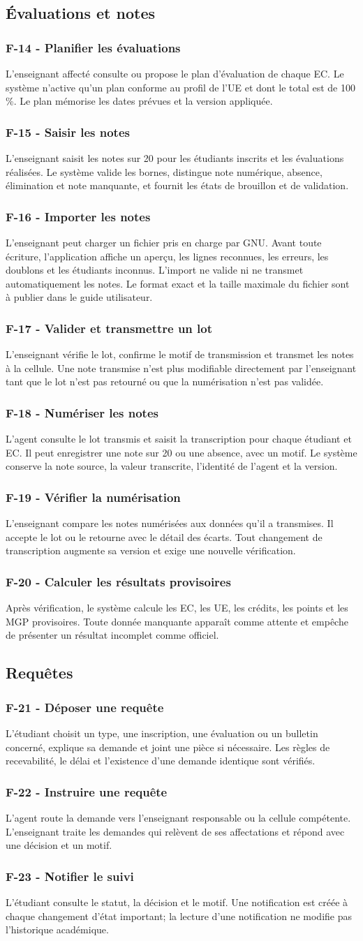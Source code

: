 \documentclass[11pt,a4paper]{article}
\newcommand{\req}[3]{\subsubsection*{#1 - #2}\noindent #3\par\medskip}
\begin{document}
\subsection{Évaluations et notes}
\req{F-14}{Planifier les évaluations}{L'enseignant affecté consulte ou propose le plan d'évaluation de chaque EC. Le système n'active qu'un plan conforme au profil de l'UE et dont le total est de 100 \%. Le plan mémorise les dates prévues et la version appliquée.}
\req{F-15}{Saisir les notes}{L'enseignant saisit les notes sur 20 pour les étudiants inscrits et les évaluations réalisées. Le système valide les bornes, distingue note numérique, absence, élimination et note manquante, et fournit les états de brouillon et de validation.}
\req{F-16}{Importer les notes}{L'enseignant peut charger un fichier pris en charge par GNU. Avant toute écriture, l'application affiche un aperçu, les lignes reconnues, les erreurs, les doublons et les étudiants inconnus. L'import ne valide ni ne transmet automatiquement les notes. Le format exact et la taille maximale du fichier sont à publier dans le guide utilisateur.}
\req{F-17}{Valider et transmettre un lot}{L'enseignant vérifie le lot, confirme le motif de transmission et transmet les notes à la cellule. Une note transmise n'est plus modifiable directement par l'enseignant tant que le lot n'est pas retourné ou que la numérisation n'est pas validée.}
\req{F-18}{Numériser les notes}{L'agent consulte le lot transmis et saisit la transcription pour chaque étudiant et EC. Il peut enregistrer une note sur 20 ou une absence, avec un motif. Le système conserve la note source, la valeur transcrite, l'identité de l'agent et la version.}
\req{F-19}{Vérifier la numérisation}{L'enseignant compare les notes numérisées aux données qu'il a transmises. Il accepte le lot ou le retourne avec le détail des écarts. Tout changement de transcription augmente sa version et exige une nouvelle vérification.}
\req{F-20}{Calculer les résultats provisoires}{Après vérification, le système calcule les EC, les UE, les crédits, les points et les MGP provisoires. Toute donnée manquante apparaît comme attente et empêche de présenter un résultat incomplet comme officiel.}

\subsection{Requêtes}
\req{F-21}{Déposer une requête}{L'étudiant choisit un type, une inscription, une évaluation ou un bulletin concerné, explique sa demande et joint une pièce si nécessaire. Les règles de recevabilité, le délai et l'existence d'une demande identique sont vérifiés.}
\req{F-22}{Instruire une requête}{L'agent route la demande vers l'enseignant responsable ou la cellule compétente. L'enseignant traite les demandes qui relèvent de ses affectations et répond avec une décision et un motif.}
\req{F-23}{Notifier le suivi}{L'étudiant consulte le statut, la décision et le motif. Une notification est créée à chaque changement d'état important; la lecture d'une notification ne modifie pas l'historique académique.}
\end{document}
